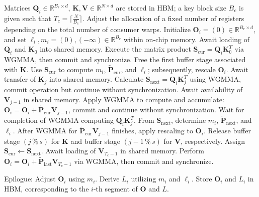 \begin{algorithm}[H]
    \caption{\small\label{alg:flash3_wgmma}\textsc{FlashAttention-3} consumer warpgroup forward pass}
    \begin{algorithmic}[1]
      \REQUIRE Matrices $\mathbf{Q}_i \in \mathbb{R}^{B_r \times d}$, $\mathbf{K}, \mathbf{V} \in \mathbb{R}^{N \times d}$ are stored in HBM; a key block size $B_c$ is given such that $T_c = \lceil \frac{N}{B_c} \rceil$.
      \STATE Adjust the allocation of a fixed number of registers depending on the total number of consumer warps.
      \STATE Initialize $\mathbf{O}_i = (0) \in \mathbb{R}^{B_r \times d}$, and set $\ell_i, m_i = (0), (-\infty) \in \mathbb{R}^{B_r}$ within on-chip memory.
      \STATE Await loading of $\mathbf{Q}_i$ and $\mathbf{K}_0$ into shared memory.
      \STATE Execute the matrix product $\mathbf{S}_{\mathrm{cur}} = \mathbf{Q}_i \mathbf{K}_0^T$ via WGMMA, then commit and synchronize.
      \STATE Free the first buffer stage associated with $\mathbf{K}$.
      \STATE Use $\mathbf{S}_{\mathrm{cur}}$ to compute $m_{i}$, $\tilde{\mathbf{P}}_{\mathrm{cur}}$, and $\ell_{i}$; subsequently, rescale $\mathbf{O}_i$.
        \STATE Await transfer of $\mathbf{K}_j$ into shared memory.
        \label{code:mainloop_start}
        \STATE Calculate $\mathbf{S}_{\mathrm{next}} = \mathbf{Q}_i \mathbf{K}_{j}^T$ using WGMMA, commit operation but continue without synchronization. \label{code:first_wgmma}
        \STATE Await availability of $\mathbf{V}_{j-1}$ in shared memory.
        \STATE Apply WGMMA to compute and accumulate: $\mathbf{O}_{i} = \mathbf{O}_{i} + \tilde{\mathbf{P}}_{\mathrm{cur}} \mathbf{V}_{j-1}$, commit and continue without synchronization. \label{code:second_wgmma}
        \STATE Wait for completion of WGMMA computing $\mathbf{Q}_i \mathbf{K}_{j}^T$.
        \STATE From $\mathbf{S}_{\mathrm{next}}$, determine $m_{i}$, $\tilde{\mathbf{P}}_{\mathrm{next}}$, and $\ell_{i}$. \label{code:softmax}
        \STATE After WGMMA for $\tilde{\mathbf{P}}_{\mathrm{cur}} \mathbf{V}_{j-1}$ finishes, apply rescaling to $\mathbf{O}_i$.
        \STATE Release buffer stage $(j\,\%\,s)$ for $\mathbf{K}$ and buffer stage $(j-1\,\%\,s)$ for $\mathbf{V}$, respectively.
        \STATE Assign $\mathbf{S}_{\mathrm{cur}} \leftarrow \mathbf{S}_{\mathrm{next}}$.
        \label{code:mainloop_end}
      \ENDFOR \STATE Await loading of $\mathbf{V}_{T_c - 1}$ in shared memory.
      \STATE Perform
      $\mathbf{O}_{i} = \mathbf{O}_{i} + \tilde{\mathbf{P}}_{\mathrm{last}} \mathbf{V}_{T_c - 1}$ via WGMMA, then commit and synchronize.

\STATE Epilogue: Adjust $\mathbf{O}_{i}$ using $m_{i}$. Derive $L_{i}$ utilizing $m_{i}$ and $\ell_{i}$. 
Store $\mathbf{O}_{i}$ and $L_{i}$ in HBM, corresponding to the $i$-th segment of $\mathbf{O}$ and $L$. 
\end{algorithmic}
\end{algorithm}

